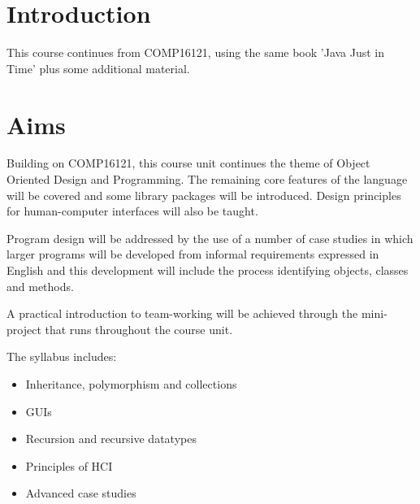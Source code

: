 \section*{Introduction}

This course continues from COMP16121, using the same book 'Java Just in Time'
plus some additional material.

\section*{Aims}

Building on COMP16121, this course unit continues the theme of Object Oriented
Design and Programming. The remaining core features of the language will be
covered and some library packages will be introduced. Design principles for
human-computer interfaces will also be taught.

Program design will be addressed by the use of a number of case studies in which
larger programs will be developed from informal requirements expressed in
English and this development will include the process identifying objects,
classes and methods.

A practical introduction to team-working will be achieved through the mini-
project that runs throughout the course unit.

The syllabus includes:

\begin{itemize}
	\item Inheritance, polymorphism and collections
	\item GUIs
	\item Recursion and recursive datatypes
	\item Principles of HCI
	\item Advanced case studies
\end{itemize}